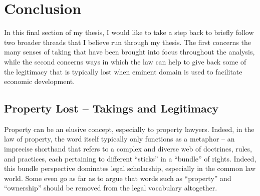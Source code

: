 \chapter{Conclusion}

In this final section of my thesis, I would like to take a step back to briefly follow two broader threads that I believe run through my thesis. The first concerns the many senses of taking that have been brought into focus throughout the analysis, while the second concerns ways in which the law can help to give back some of the legitimacy that is typically lost when eminent domain is used to facilitate economic development.

\section{Property Lost -- Takings and Legitimacy}

Property can be an elusive concept, especially to property lawyers. Indeed, in the law of property, the word itself typically only functions as a metaphor -- an imprecise shorthand that refers to a complex and diverse web of doctrines, rules, and practices, each pertaining to different ``sticks'' in a ``bundle'' of rights. Indeed, this bundle perspective dominates legal scholarship, especially in the common law world. Some even go as far as to argue that words such as ``property'' and ``ownership'' should be removed from the legal vocabulary altogether. 

